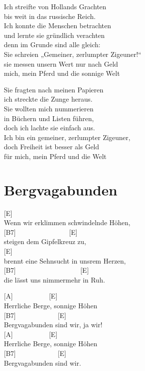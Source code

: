 \documentclass[
  letterpaper,
]{scrbook}
\begin{document}
Ich streifte von Hollands Grachten\\
bis weit in das russische Reich.\\
Ich konnte die Menschen betrachten\\
und lernte sie gründlich verachten\\
denn im Grunde sind alle gleich:\\
Sie schreien „Gemeiner, zerlumpter Zigeuner!{}``\\
sie messen unsern Wert nur nach Geld\\
mich, mein Pferd und die sonnige Welt

Sie fragten nach meinen Papieren\\
ich streckte die Zunge heraus.\\
Sie wollten mich nummerieren\\
in Büchern und Listen führen,\\
doch ich lachte sie einfach aus.\\
Ich bin ein gemeiner, zerlumpter Zigeuner,\\
doch Freiheit ist besser als Geld\\
für mich, mein Pferd und die Welt

\hypertarget{bergvagabunden}{%
\chapter{Bergvagabunden}\label{bergvagabunden}}

{[}E{]}\\
Wenn wir erklimmen schwindelnde Höhen,\\
{[}B7{]} ~ ~ ~ ~ ~ ~ ~ ~ ~ {[}E{]}\\
steigen dem Gipfelkreuz zu,\\
{[}E{]}\\
brennt eine Sehnsucht in uns\textquotesingle rem Herzen,\\
{[}B7{]} ~ ~ ~ ~ ~ ~ ~ ~ ~ ~ ~ {[}E{]}\\
die lässt uns nimmermehr in Ruh.

{[}A{]} ~ ~ ~ ~ ~ ~ {[}E{]}\\
Herrliche Berge, sonnige Höhen\\
{[}B7{]} ~ ~ ~ ~ ~ ~ ~ {[}E{]}\\
Bergvagabunden sind wir, ja wir!\\
{[}A{]} ~ ~ ~ ~ ~ ~ {[}E{]}\\
Herrliche Berge, sonnige Höhen\\
{[}B7{]} ~ ~ ~ ~ ~ ~ ~ {[}E{]}\\
Bergvagabunden sind wir.
\end{document}
